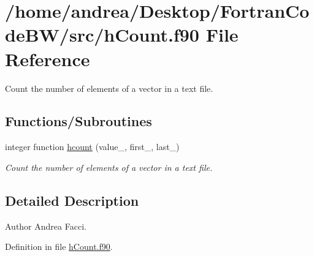 \hypertarget{h_count_8f90}{\section{/home/andrea/\-Desktop/\-Fortran\-Code\-B\-W/src/h\-Count.f90 File Reference}
\label{h_count_8f90}
}


Count the number of elements of a vector in a text file.  


\subsection*{Functions/\-Subroutines}
\begin{DoxyCompactItemize}
\item 
integer function \hyperlink{h_count_8f90_aabd14fa726542746b1102412257a55c6}{hcount} (value\-\_\-, first\-\_\-, last\-\_\-)
\begin{DoxyCompactList}\small\item\em Count the number of elements of a vector in a text file. \end{DoxyCompactList}\end{DoxyCompactItemize}


\subsection{Detailed Description}
\begin{DoxyAuthor}{Author}
Andrea Facci. 
\end{DoxyAuthor}


Definition in file \hyperlink{h_count_8f90_source}{h\-Count.\-f90}.



